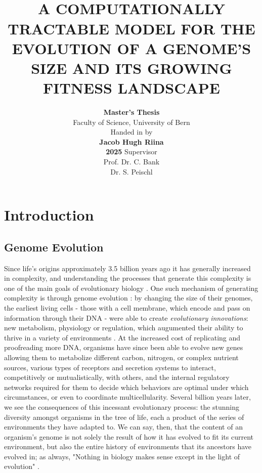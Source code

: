 \documentclass[paper=a4, fontsize=11pt,twoside]{scrartcl}       %
\title{
                        \HRule{0.5pt} \\                                                %
                        \LARGE \textbf{\uppercase{A Computationally Tractable Model for the Evolution of a Genome's Size and its Growing Fitness Landscape}}      %
                        \HRule{2pt} \\ [0.5cm]          %
                }
\author{
                \textbf{Master's Thesis}\\
                Faculty of Science, University of Bern\\
                \vspace{1cm}
                Handed in by \\
                \textbf{Jacob Hugh Riina} \\
		\vspace{2cm}
		\textbf{2025}
                \vfill
                Supervisor\\
                Prof. Dr. C. Bank\\
                Dr. S. Peischl\\
}
\makeatletter
\def\printtitle{%
    {\centering \@title\par}}
\def\printauthor{%
    {\centering \large \@author}}
\makeatother
\begin{document}

\thispagestyle{empty}           %

\printtitle                                     %
        \vfill
\printauthor                            %
\newpage


\setcounter{page}{1}            %

\section*{Introduction}

\subsection*{Genome Evolution}

Since life's origins approximately 3.5 billion years ago it has generally increased in complexity, and understanding the processes that generate this complexity is one of the main goals of evolutionary biology \cite{duclosInvestigatingEvolutionDevelopment2019}\cite{mcshea2010biology}. One such mechanism of generating complexity is through genome evolution \cite{lynchOriginsGenomeComplexity2003}: by changing the size of their genomes, the earliest living cells - those with a cell membrane, which encode and pass on information through their DNA - were able to create \textit{evolutionary innovations}: new metabolism, physiology or regulation, which augumented their ability to thrive in a variety of environments \cite{barveLatentCapacityEvolutionary2013}\cite{uebbingEvolutionaryInnovationsConserved2024}. At the increased cost of replicating and proofreading more DNA, organisms have since been able to evolve new genes allowing them to metabolize different carbon, nitrogen, or complex nutrient sources, various types of receptors and secretion systems to interact, competitively or mutualistically, with others, and the internal regulatory networks required for them to decide which behaviors are optimal under which circumstances, or even to coordinate multicellularity. Several billion years later, we see the consequences of this incessant evolutionary process: the stunning diversity amongst organisms in the tree of life, each a product of the series of environments they have adapted to. We can say, then, that the content of an organism's genome is not solely the result of how it has evolved to fit its current environment, but also the entire history of environments that its ancestors have evolved in; as always, "Nothing in biology makes sense except in the light of evolution" \cite{dobzhanskyBIOLOGYMOLECULARORGANISMIC1964}.
\end{document}
